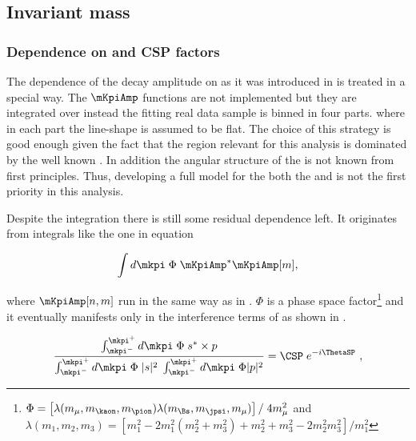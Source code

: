 \subsection{\Kpi Invariant mass}
\label{Kpi_Invariant_mass}

\subsubsection{Dependence on \mkpi and CSP factors}
The dependence of the \BJpsiKpi decay amplitude on \mkpi as it was introduced in  is treated in a special way.
The $\mKpiAmp$ functions are not implemented but they are integrated over \mkpi instead the fitting real data sample is binned in four parts.
where in each part the \mkpi line-shape is assumed to be flat.
The choice of this strategy is good enough given the fact that the \mkpi region relevant for this analysis is dominated by the well
known \pwave. In addition the angular structure of the \swave is not known from first principles. Thus, developing a full model for the both
the \pwave and \swave is not the first priority in this analysis.

Despite the \mkpi integration there is still some residual dependence left. It originates from integrals
like the one in equation 

\begin{equation}
  \label{spIntegrals}
  \int d\mkpi \; \Phi \; \mKpiAmp^* \mKpiAmp[m],
\end{equation}

\noindent where $\mKpiAmp[n,m]$ run in the same way as in . $\Phi$ is a phase space
factor\footnote{$\Phi = \left[ \lambda(m_\mu,m_\kaon,m_\pion) \lambda(m_{\Bs},m_\jpsi,m_\mu) \right] / \; 4 m_\mu^2$  and \\
$\lambda(m_1,m_2,m_3) = \left[ m_1^2 - 2m_1^2(m_2^2 + m_3^2) + m_2^2 + m_3^2 - 2m_2^2m_3^2 \right] / m_1^2 $
} and it eventually manifests only in the \spwave interference terms of  as shown
in .

\begin{equation}
  \label{csp_def}
  \frac{\int_{\mkpi^-}^{\mkpi^+} d\mkpi \; \Phi \; s^* \times p} {\int_{\mkpi^-}^{\mkpi^+} d\mkpi \; \Phi \; |s|^2 \; \int_{\mkpi^-}^{\mkpi^+} d\mkpi \; \Phi |p|^2} = \CSP \; e^{-i\ThetaSP} \ ,
\end{equation}


